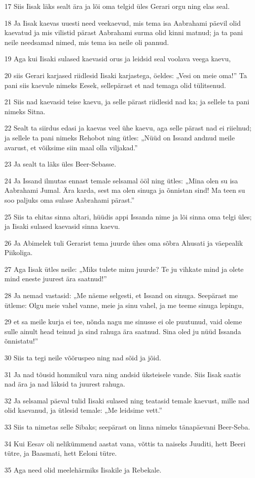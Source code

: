 \par 17 Siis Iisak läks sealt ära ja lõi oma telgid üles Gerari orgu ning elas seal.
\par 18 Ja Iisak kaevas uuesti need veekaevud, mis tema isa Aabrahami päevil olid kaevatud ja mis vilistid pärast Aabrahami surma olid kinni matnud; ja ta pani neile needsamad nimed, mis tema isa neile oli pannud.
\par 19 Aga kui Iisaki sulased kaevasid orus ja leidsid seal voolava veega kaevu,
\par 20 siis Gerari karjased riidlesid Iisaki karjastega, öeldes: „Vesi on meie oma!” Ta pani siis kaevule nimeks Eesek, sellepärast et nad temaga olid tülitsenud.
\par 21 Siis nad kaevasid teise kaevu, ja selle pärast riidlesid nad ka; ja sellele ta pani nimeks Sitna.
\par 22 Sealt ta siirdus edasi ja kaevas veel ühe kaevu, aga selle pärast nad ei riielnud; ja sellele ta pani nimeks Rehobot ning ütles: „Nüüd on Issand andnud meile avarust, et võiksime siin maal olla viljakad.”
\par 23 Ja sealt ta läks üles Beer-Sebasse.
\par 24 Ja Issand ilmutas ennast temale selsamal ööl ning ütles: „Mina olen su isa Aabrahami Jumal. Ära karda, sest ma olen sinuga ja õnnistan sind! Ma teen su soo paljuks oma sulase Aabrahami pärast.”
\par 25 Siis ta ehitas sinna altari, hüüdis appi Issanda nime ja lõi sinna oma telgi üles; ja Iisaki sulased kaevasid sinna kaevu.
\par 26 Ja Abimelek tuli Gerarist tema juurde ühes oma sõbra Ahusati ja väepealik Piikoliga.
\par 27 Aga Iisak ütles neile: „Miks tulete minu juurde? Te ju vihkate mind ja olete mind eneste juurest ära saatnud!”
\par 28 Ja nemad vastasid: „Me näeme selgesti, et Issand on sinuga. Seepärast me ütleme: Olgu meie vahel vanne, meie ja sinu vahel, ja me teeme sinuga lepingu,
\par 29 et sa meile kurja ei tee, nõnda nagu me sinusse ei ole puutunud, vaid oleme sulle ainult head teinud ja sind rahuga ära saatnud. Sina oled ju nüüd Issanda õnnistatu!”
\par 30 Siis ta tegi neile võõruspeo ning nad sõid ja jõid.
\par 31 Ja nad tõusid hommikul vara ning andsid üksteisele vande. Siis Iisak saatis nad ära ja nad läksid ta juurest rahuga.
\par 32 Ja selsamal päeval tulid Iisaki sulased ning teatasid temale kaevust, mille nad olid kaevanud, ja ütlesid temale: „Me leidsime vett.”
\par 33 Siis ta nimetas selle Sibaks; seepärast on linna nimeks tänapäevani Beer-Seba.
\par 34 Kui Eesav oli nelikümmend aastat vana, võttis ta naiseks Juuditi, hett Beeri tütre, ja Baasmati, hett Eeloni tütre.
\par 35 Aga need olid meelehärmiks Iisakile ja Rebekale.



